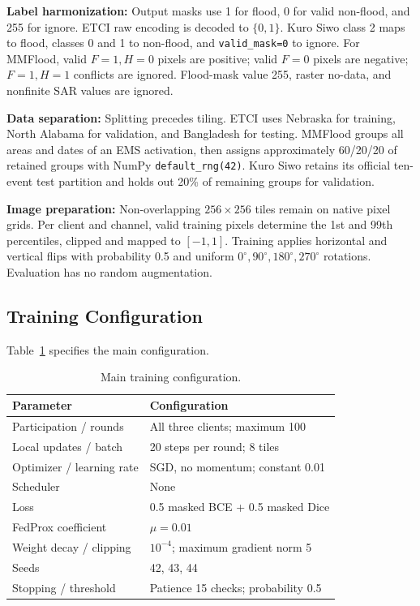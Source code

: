 \documentclass[conference]{IEEEtran}
\begin{document}
\textbf{Label harmonization:} Output masks use 1 for flood, 0 for valid non-flood, and 255 for ignore. ETCI raw encoding is decoded to $\{0, 1\}$. Kuro Siwo class 2 maps to flood, classes 0 and 1 to non-flood, and \texttt{valid\_mask=0} to ignore. For MMFlood, valid $F=1, H=0$ pixels are positive; valid $F=0$ pixels are negative; $F=1, H=1$ conflicts are ignored. Flood-mask value 255, raster no-data, and nonfinite SAR values are ignored.

\textbf{Data separation:} Splitting precedes tiling. ETCI uses Nebraska for training, North Alabama for validation, and Bangladesh for testing. MMFlood groups all areas and dates of an EMS activation, then assigns approximately 60/20/20 of retained groups with NumPy \texttt{default\_rng(42)}. Kuro Siwo retains its official ten-event test partition and holds out 20\% of remaining groups for validation.

\textbf{Image preparation:} Non-overlapping $256 \times 256$ tiles remain on native pixel grids. Per client and channel, valid training pixels determine the 1st and 99th percentiles, clipped and mapped to $[-1, 1]$. Training applies horizontal and vertical flips with probability 0.5 and uniform $0^\circ, 90^\circ, 180^\circ, 270^\circ$ rotations. Evaluation has no random augmentation.

\subsection{Training Configuration}
Table~\ref{tab:train_cfg} specifies the main configuration.
\begin{table}[h]
\centering
\caption{Main training configuration.}
\label{tab:train_cfg}
\small
\begin{tabularx}{\columnwidth}{lX}
\toprule
\textbf{Parameter} & \textbf{Configuration} \\
\midrule
Participation / rounds & All three clients; maximum 100 \\
Local updates / batch & 20 steps per round; 8 tiles \\
Optimizer / learning rate & SGD, no momentum; constant 0.01 \\
Scheduler & None \\
Loss & 0.5 masked BCE + 0.5 masked Dice \\
FedProx coefficient & $\mu = 0.01$ \\
Weight decay / clipping & $10^{-4}$; maximum gradient norm 5 \\
Seeds & 42, 43, 44 \\
Stopping / threshold & Patience 15 checks; probability 0.5 \\
\bottomrule
\end{tabularx}
\end{table}
\end{document}
